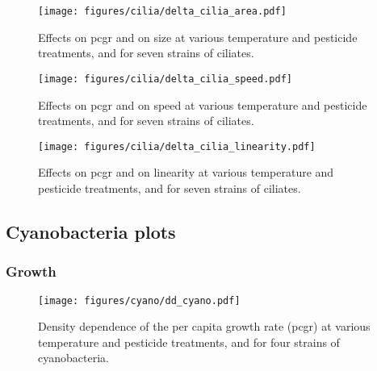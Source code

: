 \begin{figure}[hbt!]
    \centering
    \texttt{[image: figures/cilia/delta\_cilia\_area.pdf]}
    \caption{Effects on pcgr and on size at various temperature and pesticide treatments, and for seven strains of ciliates.}
    \label{fig:delta_cilia_area}
\end{figure}

\begin{figure}[hbt!]
    \centering
    \texttt{[image: figures/cilia/delta\_cilia\_speed.pdf]}
    \caption{Effects on pcgr and on speed at various temperature and pesticide treatments, and for seven strains of ciliates.}
    \label{fig:delta_cilia_speed}
\end{figure}

\begin{figure}[hbt!]
    \centering
    \texttt{[image: figures/cilia/delta\_cilia\_linearity.pdf]}
    \caption{Effects on pcgr and on linearity at various temperature and pesticide treatments, and for seven strains of ciliates.}
    \label{fig:delta_cilia_linearity}
\end{figure}




\clearpage

\subsection{Cyanobacteria plots}

\subsubsection{Growth}

\begin{figure}[hbt!]
    \centering
    \texttt{[image: figures/cyano/dd\_cyano.pdf]}
    \caption{Density dependence of the per capita growth rate (pcgr) at various temperature and pesticide treatments, and for four strains of cyanobacteria.}
    \label{fig:dd_cyano}
\end{figure}

